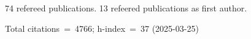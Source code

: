74 refereed publications. 13 refeered publications as first author.

Total citations~=~4766; h-index~=~37 (2025-03-25)